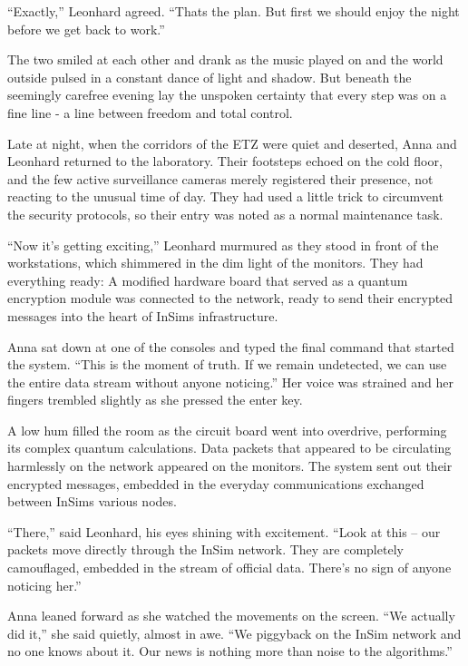 \documentclass[
]{article}
\begin{document}
``Exactly,'' Leonhard agreed. ``That\textquotesingle s the plan. But
first we should enjoy the night before we get back to work.''

The two smiled at each other and drank as the music played on and the
world outside pulsed in a constant dance of light and shadow. But
beneath the seemingly carefree evening lay the unspoken certainty that
every step was on a fine line - a line between freedom and total
control.

Late at night, when the corridors of the ETZ were quiet and deserted,
Anna and Leonhard returned to the laboratory. Their footsteps echoed on
the cold floor, and the few active surveillance cameras merely
registered their presence, not reacting to the unusual time of day. They
had used a little trick to circumvent the security protocols, so their
entry was noted as a normal maintenance task.

``Now it's getting exciting,'' Leonhard murmured as they stood in front
of the workstations, which shimmered in the dim light of the monitors.
They had everything ready: A modified hardware board that served as a
quantum encryption module was connected to the network, ready to send
their encrypted messages into the heart of InSim\textquotesingle s
infrastructure.

Anna sat down at one of the consoles and typed the final command that
started the system. ``This is the moment of truth. If we remain
undetected, we can use the entire data stream without anyone noticing.''
Her voice was strained and her fingers trembled slightly as she pressed
the enter key.

A low hum filled the room as the circuit board went into overdrive,
performing its complex quantum calculations. Data packets that appeared
to be circulating harmlessly on the network appeared on the monitors.
The system sent out their encrypted messages, embedded in the everyday
communications exchanged between InSim\textquotesingle s various nodes.

``There,'' said Leonhard, his eyes shining with excitement. ``Look at
this -- our packets move directly through the InSim network. They are
completely camouflaged, embedded in the stream of official data. There's
no sign of anyone noticing her.''

Anna leaned forward as she watched the movements on the screen. ``We
actually did it,'' she said quietly, almost in awe. ``We piggyback on
the InSim network and no one knows about it. Our news is nothing more
than noise to the algorithms.''
\end{document}

